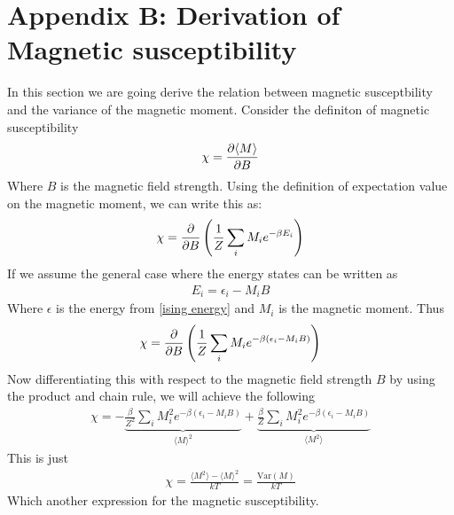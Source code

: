 \documentclass[a4paper, 10pt]{article}
\begin{document}
\section{Appendix B: Derivation of Magnetic susceptibility \label{magnetic susceptibility}} In this section we are going derive the relation between
magnetic susceptbility and the variance of the magnetic moment. Consider the definiton of magnetic susceptibility
\begin{align}
\chi = \pdv{\langle M \rangle}{B}
\end{align}
Where $B$ is the magnetic field strength. Using the definition of expectation value
on the magnetic moment, we can write this as:
\begin{align}
  \chi = \pdv{B}\left(\frac{1}{Z}\sum_{i}M_{i}e^{-\beta E_{i}}\right)
\end{align}
If we assume the general case where the energy states can be written as
\begin{align}
  E_{i} = \epsilon_{i} - M_{i}B
\end{align}
Where $\epsilon$ is the energy from \eqref{ising energy} and $M_{i}$ is the magnetic moment.
Thus
\begin{align}
  \chi = \pdv{B}\left(\frac{1}{Z}\sum_{i}M_{i}e^{-\beta(\epsilon_{i} - M_{i}B)}\right)
\end{align}
Now differentiating this with respect to the magnetic field strength $B$ by using the product and chain rule, we will achieve the
following
\begin{align}
  \chi = -\underbrace{\frac{\beta}{Z^{2}}\sum_{i}M_{i}^{2}e^{-\beta ( \epsilon_{i} - M_{i}B)}}_{\langle M \rangle^{2}}
  + \underbrace{\frac{\beta}{Z}\sum_{i}M_{i}^{2}e^{-\beta ( \epsilon_{i} - M_{i}B)}}_{\langle M^{2} \rangle}
\end{align}
This is just
\begin{align}
  \chi = \frac{\langle M^{2} \rangle - \langle M \rangle^{2}}{kT} = \frac{\mathrm{Var}(M)}{kT}
\end{align}
Which another expression for the magnetic susceptibility.
\end{document}
